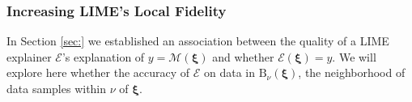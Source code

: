 \documentclass[mnsc,blindrev]{informs3}
\begin{document}
        
            
        
    
        
            
   
    
 
    

        \subsubsection{Increasing LIME's Local Fidelity}
            In Section \ref{sec:} we established an association between the quality of a LIME explainer $\mathcal{E}$'s explanation of $y=\mathcal{M}(\boldsymbol{\xi})$ and whether $\mathcal{E}(\boldsymbol{\xi}) = y$. We will explore here whether the accuracy of $\mathcal{E}$ on data in $\text{B}_\nu(\boldsymbol{\xi})$, the neighborhood of data samples within $\nu$ of $\boldsymbol{\xi}$. 


\end{document}
